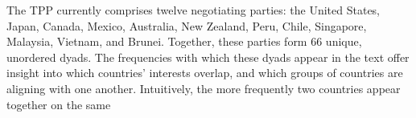 \documentclass[12pt]{article}
\begin{document}
The TPP currently comprises twelve negotiating parties: the United States, Japan, Canada, Mexico, 
Australia, New Zealand, Peru, Chile, Singapore, Malaysia, Vietnam, and Brunei. Together, 
these parties form 66 unique, unordered dyads. 
% 
The frequencies with which these dyads appear in the text offer insight into which countries' interests overlap, 
and which groups of countries are 
aligning with one another. Intuitively, the more frequently two countries appear together on the same 
\end{document}
